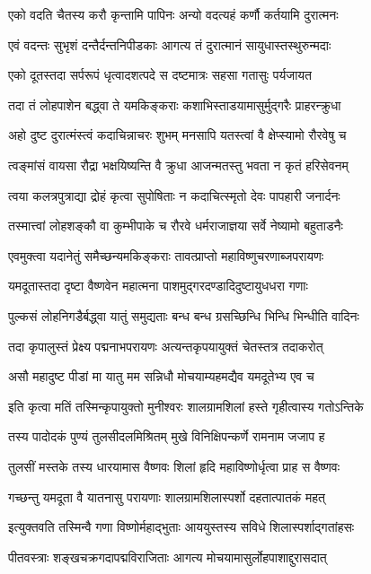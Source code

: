 \twolineshloka
{एको वदति चैतस्य करौ कृन्तामि पापिनः}
{अन्यो वदत्यहं कर्णौ कर्तयामि दुरात्मनः}%

\twolineshloka
{एवं वदन्तः सुभृशं दन्तैर्दन्तनिपीडकाः}
{आगत्य तं दुरात्मानं सायुधास्तस्थुरुन्मदाः}%

\twolineshloka
{एको दूतस्तदा सर्परूपं धृत्वादशत्पदे}
{स दष्टमात्रः सहसा गतासुः पर्यजायत}%

\twolineshloka
{तदा तं लोहपाशेन बद्ध्वा ते यमकिङ्कराः}
{कशाभिस्ताडयामासुर्मुद्गरैः प्राहरन्क्रुधा}%

\twolineshloka
{अहो दुष्ट दुरात्मंस्त्वं कदाचिन्नाचरः शुभम्}
{मनसापि यतस्त्वां वै क्षेप्स्यामो रौरवेषु च}%

\twolineshloka
{त्वङ्मांसं वायसा रौद्रा भक्षयिष्यन्ति वै क्रुधा}
{आजन्मतस्तु भवता न कृतं हरिसेवनम्}%

\twolineshloka
{त्वया कलत्रपुत्राद्या द्रोहं कृत्वा सुपोषिताः}
{न कदाचित्स्मृतो देवः पापहारी जनार्दनः}%

\twolineshloka
{तस्मात्त्वां लोहशङ्कौ वा कुम्भीपाके च रौरवे}
{धर्मराजाज्ञया सर्वे नेष्यामो बहुताडनैः}%

\twolineshloka
{एवमुक्त्वा यदानेतुं समैच्छन्यमकिङ्कराः}
{तावत्प्राप्तो महाविष्णुचरणाब्जपरायणः}%

\twolineshloka
{यमदूतास्तदा दृष्टा वैष्णवेन महात्मना}
{पाशमुद्गरदण्डादिदुष्टायुधधरा गणाः}%

\twolineshloka
{पुल्कसं लोहनिगडैर्बद्ध्वा यातुं समुद्यताः}
{बन्ध बन्ध ग्रसच्छिन्धि भिन्धि भिन्धीति वादिनः}%

\twolineshloka
{तदा कृपालुस्तं प्रेक्ष्य पद्मनाभपरायणः}
{अत्यन्तकृपयायुक्तं चेतस्तत्र तदाकरोत्}%

\twolineshloka
{असौ महादुष्ट पीडां मा यातु मम सन्निधौ}
{मोचयाम्यहमद्यैव यमदूतेभ्य एव च}%

\twolineshloka
{इति कृत्वा मतिं तस्मिन्कृपायुक्तो मुनीश्वरः}
{शालग्रामशिलां हस्ते गृहीत्वास्य गतोऽन्तिके}%

\twolineshloka
{तस्य पादोदकं पुण्यं तुलसीदलमिश्रितम्}
{मुखे विनिक्षिपन्कर्णे रामनाम जजाप ह}%

\twolineshloka
{तुलसीं मस्तके तस्य धारयामास वैष्णवः}
{शिलां हृदि महाविष्णोर्धृत्वा प्राह स वैष्णवः}%

\twolineshloka
{गच्छन्तु यमदूता वै यातनासु परायणाः}
{शालग्रामशिलास्पर्शो दहतात्पातकं महत्}%

\twolineshloka
{इत्युक्तवति तस्मिन्वै गणा विष्णोर्महाद्भुताः}
{आययुस्तस्य सविधे शिलास्पर्शाद्गतांहसः}%

\twolineshloka
{पीतवस्त्राः शङ्खचक्रगदापद्मविराजिताः}
{आगत्य मोचयामासुर्लोहपाशाद्दुरासदात्}%

